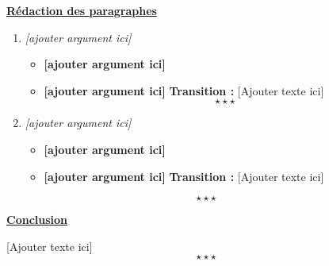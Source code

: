 \begin{center}
	{\bfseries \underline{Rédaction des paragraphes}}	
\end{center}
\begin{enumerate}[label*=$\longrightarrow$]
	\item \textit{[ajouter argument ici]}
	\begin{itemize}
		\item \textbf{[ajouter argument ici]}
		\item \textbf{[ajouter argument ici]} \newline 
		\textbf{Transition :} [Ajouter texte ici] $$\star \star \star$$
	\end{itemize}
	\item \textit{[ajouter argument ici]}
	\begin{itemize}
		\item \textbf{[ajouter argument ici]}
		\item \textbf{[ajouter argument ici]} \newline 
		\textbf{Transition :} [Ajouter texte ici]
	\end{itemize}
\end{enumerate}
$$\star \star \star$$
\begin{center}
	\textbf{\underline{Conclusion}} 
\end{center} 

[Ajouter texte ici] $$\star \star \star$$